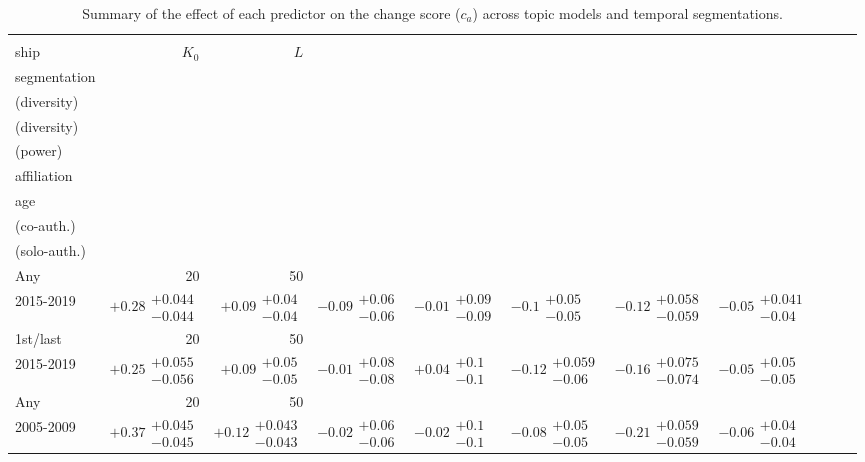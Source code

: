 \begin{table}[H]
\caption{Summary of the effect of each predictor on the change score ($c_a$) across topic models and temporal segmentations.}
\label{table:full_summary_change}
\renewcommand{\arraystretch}{2}\fontsize{6}{7}\selectfont\begin{tabular}{lrrllllllll}
\toprule
\makecell{Author-\\ ship} & $K_0$ & $L$ & \makecell{Temporal \\ segmentation} & \makecell{Intell. capital \\ (diversity)} & \makecell{Soc. capital \\ (diversity)} & \makecell{Soc. capital \\ (power)} & \makecell{Stable \\ affiliation} & \makecell{Academic \\ age} & \makecell{Prod. \\ (co-auth.)} & \makecell{Prod. \\ (solo-auth.)} \\
\midrule
Any & 20 & 50 & \makecell{2000-2009 \\ 2015-2019} & $\bm{+0.28}\substack{+0.044 \\ -0.044}$ & $\bm{+0.09}\substack{+0.04 \\ -0.04}$ & $\bm{-0.09}\substack{+0.06 \\ -0.06}$ & $-0.01\substack{+0.09 \\ -0.09}$ & $\bm{-0.1}\substack{+0.05 \\ -0.05}$ & $\bm{-0.12}\substack{+0.058 \\ -0.059}$ & $\bm{-0.05}\substack{+0.041 \\ -0.04}$ \\
1st/last & 20 & 50 & \makecell{2000-2009 \\ 2015-2019} & $\bm{+0.25}\substack{+0.055 \\ -0.056}$ & $\bm{+0.09}\substack{+0.05 \\ -0.05}$ & $-0.01\substack{+0.08 \\ -0.08}$ & $+0.04\substack{+0.1 \\ -0.1}$ & $\bm{-0.12}\substack{+0.059 \\ -0.06}$ & $\bm{-0.16}\substack{+0.075 \\ -0.074}$ & $-0.05\substack{+0.05 \\ -0.05}$ \\
Any & 20 & 50 & \makecell{2000-2004 \\ 2005-2009} & $\bm{+0.37}\substack{+0.045 \\ -0.045}$ & $\bm{+0.12}\substack{+0.043 \\ -0.043}$ & $-0.02\substack{+0.06 \\ -0.06}$ & $-0.02\substack{+0.1 \\ -0.1}$ & $\bm{-0.08}\substack{+0.05 \\ -0.05}$ & $\bm{-0.21}\substack{+0.059 \\ -0.059}$ & $\bm{-0.06}\substack{+0.04 \\ -0.04}$ \\

\end{tabular}
\end{table}
